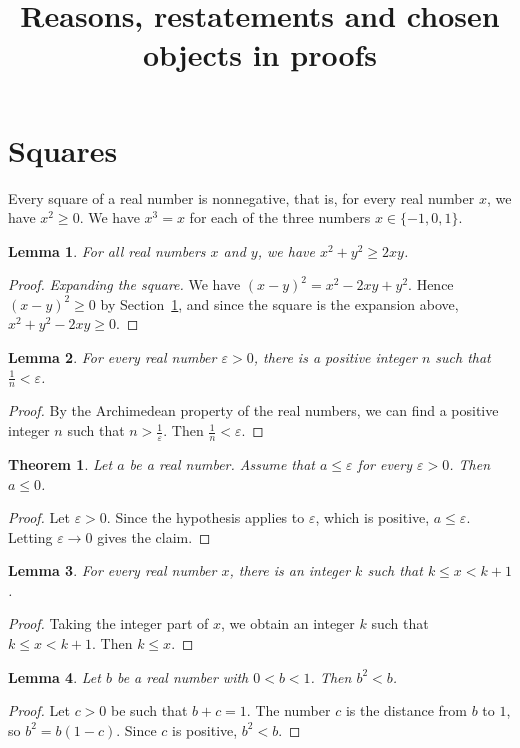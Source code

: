 \documentclass{article}
\title{Reasons, restatements and chosen objects in proofs}
\newtheorem{theorem}{Theorem}
\newtheorem{lemma}{Lemma}
\begin{document}
\maketitle

\section{Squares}\label{sec:squares}

Every square of a real number is nonnegative, that is, for every real number $x$, we have $x^2\ge0$.
We have $x^3=x$ for each of the three numbers $x\in\{-1,0,1\}$.

\begin{lemma}\label{lem:sum}
For all real numbers $x$ and $y$, we have $x^2+y^2\ge2xy$.
\end{lemma}

\begin{proof}
\emph{Expanding the square.}
We have $(x-y)^2=x^2-2xy+y^2$.
Hence $(x-y)^2\ge0$ by Section~\ref{sec:squares}, and since the square is the expansion above, $x^2+y^2-2xy\ge0$.
\end{proof}

\begin{lemma}\label{lem:archimedes}
For every real number $\varepsilon>0$, there is a positive integer $n$ such that $\frac1n<\varepsilon$.
\end{lemma}

\begin{proof}
By the Archimedean property of the real numbers, we can find a positive integer $n$ such that $n>\frac1\varepsilon$.
Then $\frac1n<\varepsilon$.
\end{proof}

\begin{theorem}\label{thm:zero}
Let $a$ be a real number.
Assume that $a\le\varepsilon$ for every $\varepsilon>0$.
Then $a\le0$.
\end{theorem}

\begin{proof}
Let $\varepsilon>0$.
Since the hypothesis applies to $\varepsilon$, which is positive, $a\le\varepsilon$.
Letting $\varepsilon\to0$ gives the claim.
\end{proof}

\begin{lemma}\label{lem:between}
For every real number $x$, there is an integer $k$ such that $k\le x<k+1$.
\end{lemma}

\begin{proof}
Taking the integer part of $x$, we obtain an integer $k$ such that $k\le x<k+1$.
Then $k\le x$.
\end{proof}

\begin{lemma}\label{lem:small}
Let $b$ be a real number with $0<b<1$.
Then $b^2<b$.
\end{lemma}

\begin{proof}
Let $c>0$ be such that $b+c=1$.
The number $c$ is the distance from $b$ to $1$, so $b^2=b(1-c)$.
Since $c$ is positive, $b^2<b$.
\end{proof}
\end{document}
